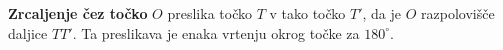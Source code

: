                 
        

        
        

            
                \textbf{Zrcaljenje čez točko} $O$ preslika točko $T$ v tako točko $T'$, da je $O$ razpolovišče daljice $TT'$. Ta preslikava je enaka vrtenju okrog točke za $180^\circ$.


